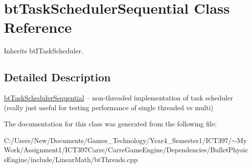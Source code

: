 \hypertarget{classbt_task_scheduler_sequential}{
\section{btTaskSchedulerSequential Class Reference}
\label{classbt_task_scheduler_sequential}
}
Inherits btITaskScheduler.



\subsection{Detailed Description}
\hyperlink{classbt_task_scheduler_sequential}{btTaskSchedulerSequential} -- non-threaded implementation of task scheduler (really just useful for testing performance of single threaded vs multi) 

The documentation for this class was generated from the following file:\begin{CompactItemize}
\item 
C:/Users/New/Documents/Games\_\-Technology/Year4\_\-Semester1/ICT397/$\sim$My Work/Assignment1/ICT397Carre/CarreGameEngine/Dependencies/BulletPhysicsEngine/include/LinearMath/btThreads.cpp\end{CompactItemize}
